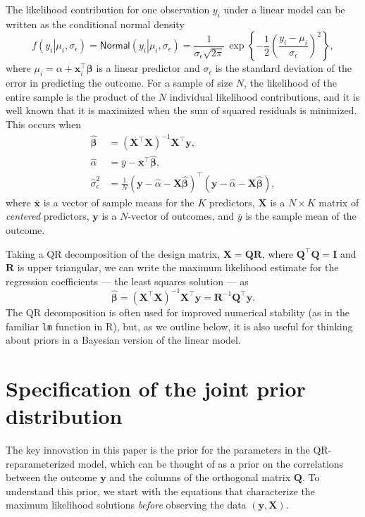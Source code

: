 \documentclass[11pt]{article}
\newcommand{\boldbeta}{\boldsymbol{\beta}}
\newcommand{\hatbeta}{\widehat{\boldbeta}}
\newcommand{\hatalpha}{\widehat{\alpha}}
\newcommand{\sigmaEps}{\sigma_{\epsilon}}
\newcommand{\X}{\mathbf{X}}
\newcommand{\y}{\mathbf{y}}
\newcommand{\Q}{\mathbf{Q}}
\newcommand{\R}{\mathbf{R}}
\newcommand{\given}{\left.\right|}
\begin{document}
The likelihood contribution for one observation $y_i$ under a linear model
can be written as the conditional normal density
%
$$
f \left(y_i \given \mu_i, \sigmaEps \right) =
\mathsf{Normal}\left(y_i \given \mu_i, \sigmaEps \right) =
\frac{1}{\sigmaEps \sqrt{2 \pi}} \,
\exp{\left\{-\frac{1}{2} \left(\frac{y_i - \mu_i}{\sigmaEps}\right)^2\right\}},
$$
%
where $\mu_i = \alpha + \mathbf{x}_i^\top \boldbeta$ is a linear predictor and
$\sigmaEps$ is the standard deviation of the error in predicting the outcome.
For a sample of size $N$, the likelihood of the entire sample is the product of
the $N$ individual likelihood contributions, and it is well known that it is
maximized when the sum of squared residuals is minimized. This occurs when
%
\begin{align*}
\hatbeta &= \left(\X^\top \X \right)^{-1} \X^\top \y,\\
\hatalpha &= \overline{y} - \overline{\mathbf{x}}^\top \hatbeta,\\
\widehat{\sigma}_{\epsilon}^2 &=
  \frac{1}{N}
  \left(\y - \hatalpha - \X \hatbeta \right)^\top
  \left(\y - \hatalpha - \X \hatbeta \right),
\end{align*}
%
where $\overline{\mathbf{x}}$ is a vector of sample means for the
$K$ predictors, $\X$ is a $N \times K$ matrix of \emph{centered} predictors,
$\y$ is a $N$-vector of outcomes, and $\overline{y}$ is the sample mean of the
outcome.

Taking a QR decomposition of the design matrix, $\X = \Q\R$, where $\Q^\top \Q =
\mathbf{I}$ and $\R$ is upper triangular, we can write the maximum likelihood
estimate for the regression coefficients --- the least squares solution --- as
%
$$\hatbeta = \left(\X^\top \X \right)^{-1} \X^\top \y = \R^{-1} \Q^\top \y.$$
%
The QR decomposition is often used for improved numerical stability (as in the
familiar {\tt lm} function in R), but, as we outline below, it is also useful
for thinking about priors in a Bayesian version of the linear model.


\section{Specification of the joint prior distribution}
\label{sec:priors}

The key innovation in this paper is the prior for the parameters in the
QR-reparameterized model, which can be thought of as a prior on the correlations
between the outcome $\y$ and the columns of the orthogonal matrix $\Q$. To
understand this prior, we start with the equations that characterize the maximum
likelihood solutions \emph{before} observing the data $\left(\y, \X\right)$.
\end{document}
